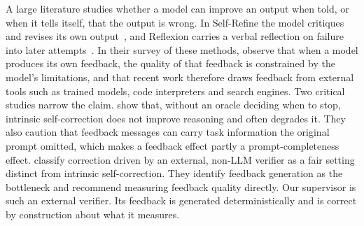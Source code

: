 A large literature studies whether a model can improve an output when told,
or when it tells itself, that the output is wrong. In Self-Refine the model
critiques and revises its own output~\citep{selfrefine}, and Reflexion carries a
verbal reflection on failure into later attempts~\citep{reflexion}. In their
survey of these methods, \citet{pan2024survey} observe that when a model
produces its own feedback, the quality of that feedback is constrained by the
model's limitations, and that recent work therefore draws feedback from external
tools such as trained models, code interpreters and search engines.
Two critical studies narrow the claim. \citet{huang2024cannot} show that,
without an oracle deciding when to stop, intrinsic self-correction does not
improve reasoning and often degrades it. They also caution that feedback
messages can carry task information the original prompt omitted, which makes a
feedback effect partly a prompt-completeness effect. \citet{kamoi2024} classify
correction driven by an external, non-LLM verifier as a fair setting distinct
from intrinsic self-correction. They identify feedback generation as the
bottleneck and recommend measuring feedback quality directly. Our supervisor is
such an external verifier. Its feedback is generated deterministically and is
correct by construction about what it measures.

